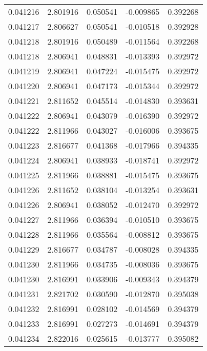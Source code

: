 \begin{tabular}{lrrrr}
0.041216    &  2.801916 &  0.050541 & -0.009865 &             0.392268 \\
0.041217    &  2.806627 &  0.050541 & -0.010518 &             0.392928 \\
0.041218    &  2.801916 &  0.050489 & -0.011564 &             0.392268 \\
0.041218    &  2.806941 &  0.048831 & -0.013393 &             0.392972 \\
0.041219    &  2.806941 &  0.047224 & -0.015475 &             0.392972 \\
0.041220    &  2.806941 &  0.047173 & -0.015344 &             0.392972 \\
0.041221    &  2.811652 &  0.045514 & -0.014830 &             0.393631 \\
0.041222    &  2.806941 &  0.043079 & -0.016390 &             0.392972 \\
0.041222    &  2.811966 &  0.043027 & -0.016006 &             0.393675 \\
0.041223    &  2.816677 &  0.041368 & -0.017966 &             0.394335 \\
0.041224    &  2.806941 &  0.038933 & -0.018741 &             0.392972 \\
0.041225    &  2.811966 &  0.038881 & -0.015475 &             0.393675 \\
0.041226    &  2.811652 &  0.038104 & -0.013254 &             0.393631 \\
0.041226    &  2.806941 &  0.038052 & -0.012470 &             0.392972 \\
0.041227    &  2.811966 &  0.036394 & -0.010510 &             0.393675 \\
0.041228    &  2.811966 &  0.035564 & -0.008812 &             0.393675 \\
0.041229    &  2.816677 &  0.034787 & -0.008028 &             0.394335 \\
0.041230    &  2.811966 &  0.034735 & -0.008036 &             0.393675 \\
0.041230    &  2.816991 &  0.033906 & -0.009343 &             0.394379 \\
0.041231    &  2.821702 &  0.030590 & -0.012870 &             0.395038 \\
0.041232    &  2.816991 &  0.028102 & -0.014569 &             0.394379 \\
0.041233    &  2.816991 &  0.027273 & -0.014691 &             0.394379 \\
0.041234    &  2.822016 &  0.025615 & -0.013777 &             0.395082 \\

\end{tabular}
